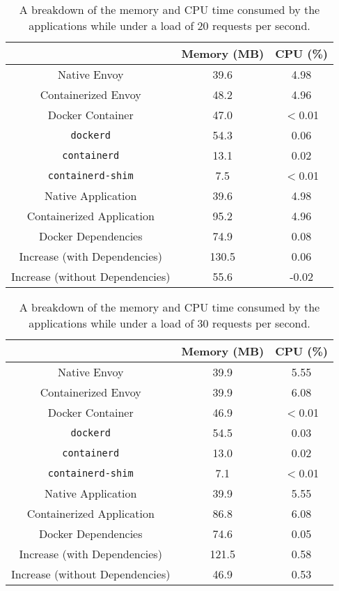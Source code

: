 \documentclass{article}
\begin{document}
\begin{table}[H]
\begin{tabular}{ |c|c|c| }
 \hline
   & Memory (MB) & CPU (\%) \\ 
 \hline
 Native Envoy & 39.6 & 4.98 \\
 \hline
 Containerized Envoy & 48.2 & 4.96 \\
 \hline
 Docker Container & 47.0 & $<$0.01 \\
 \hline
 \texttt{dockerd} & 54.3 & 0.06 \\
 \hline
 \texttt{containerd} & 13.1 & 0.02 \\
 \hline
 \texttt{containerd-shim} & 7.5 & $<$0.01 \\
 \hline\hline
 Native Application & 39.6 & 4.98 \\
 \hline
 Containerized Application & 95.2 & 4.96 \\
 \hline
 Docker Dependencies & 74.9 & 0.08 \\
 \hline\hline
 Increase (with Dependencies) & 130.5 & 0.06 \\
 \hline
 Increase (without Dependencies) & 55.6 & -0.02 \\
 \hline
\end{tabular}
\caption{A breakdown of the memory and CPU time consumed by the applications while under a load of 20 requests per second.}
\label{consumption-breakdown-under-load-20}
\end{table}

\begin{table}[H]
\begin{tabular}{ |c|c|c| }
 \hline
   & Memory (MB) & CPU (\%) \\ 
 \hline
 Native Envoy & 39.9 & 5.55 \\
 \hline
 Containerized Envoy & 39.9 & 6.08 \\
 \hline
 Docker Container & 46.9 & $<$0.01 \\
 \hline
 \texttt{dockerd} & 54.5 & 0.03 \\
 \hline
 \texttt{containerd} & 13.0 & 0.02 \\
 \hline
 \texttt{containerd-shim} & 7.1 & $<$0.01 \\
 \hline\hline
 Native Application & 39.9 & 5.55 \\
 \hline
 Containerized Application & 86.8 & 6.08 \\
 \hline
 Docker Dependencies & 74.6 & 0.05 \\
 \hline\hline
 Increase (with Dependencies) & 121.5 & 0.58 \\
 \hline
 Increase (without Dependencies) & 46.9 & 0.53 \\
 \hline
\end{tabular}
\caption{A breakdown of the memory and CPU time consumed by the applications while under a load of 30 requests per second.}
\label{consumption-breakdown-under-load-30}
\end{table}
\end{document}
